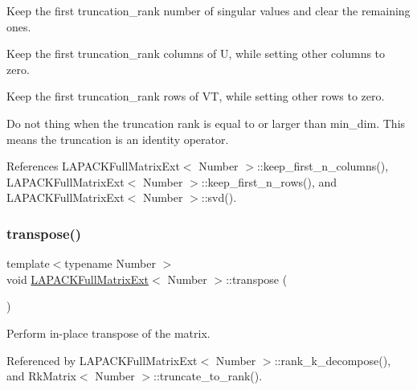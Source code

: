 Keep the first {\ttfamily truncation\+\_\+rank} number of singular values and clear the remaining ones.

Keep the first {\ttfamily truncation\+\_\+rank} columns of {\ttfamily U}, while setting other columns to zero.

Keep the first {\ttfamily truncation\+\_\+rank} rows of {\ttfamily VT}, while setting other rows to zero.

Do not thing when the truncation rank is equal to or larger than {\ttfamily min\+\_\+dim}. This means the truncation is an identity operator.

References L\+A\+P\+A\+C\+K\+Full\+Matrix\+Ext$<$ Number $>$\+::keep\+\_\+first\+\_\+n\+\_\+columns(), L\+A\+P\+A\+C\+K\+Full\+Matrix\+Ext$<$ Number $>$\+::keep\+\_\+first\+\_\+n\+\_\+rows(), and L\+A\+P\+A\+C\+K\+Full\+Matrix\+Ext$<$ Number $>$\+::svd().

\mbox{\label{classLAPACKFullMatrixExt_ac46d71bc1b0288fce7ad44b222e9210b}} 
\subsubsection{\texorpdfstring{transpose()}{transpose()}\hspace{0.1cm}{\footnotesize\ttfamily [1/2]}}
{\footnotesize\ttfamily template$<$typename Number $>$ \\
void \hyperlink{classLAPACKFullMatrixExt}{L\+A\+P\+A\+C\+K\+Full\+Matrix\+Ext}$<$ Number $>$\+::transpose (\begin{DoxyParamCaption}{ }\end{DoxyParamCaption})}

Perform in-\/place transpose of the matrix. 

Referenced by L\+A\+P\+A\+C\+K\+Full\+Matrix\+Ext$<$ Number $>$\+::rank\+\_\+k\+\_\+decompose(), and Rk\+Matrix$<$ Number $>$\+::truncate\+\_\+to\+\_\+rank().

\mbox{\label{classLAPACKFullMatrixExt_a12a95aeff6e93f0284c59cffd0fb7b8e}} 
